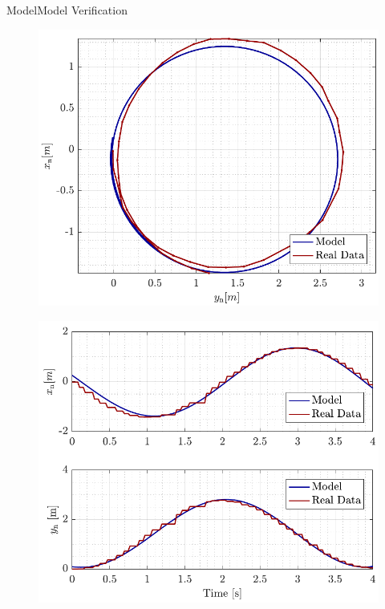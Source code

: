 \begin{frame}{Model}{Model Verification}
    \begin{minipage}{0.45\linewidth}
        \begin{figure}[H]
            \centering
            \includegraphics[width=1\linewidth]{figures/turn}
        \end{figure}        
    \end{minipage}\hfill      
    \begin{minipage}{0.45\linewidth}
        \begin{figure}[H]
            \centering
            \includegraphics[width=1\linewidth]{figures/turn_time}
        \end{figure}                
    \end{minipage}\hfill \\
\end{frame}






